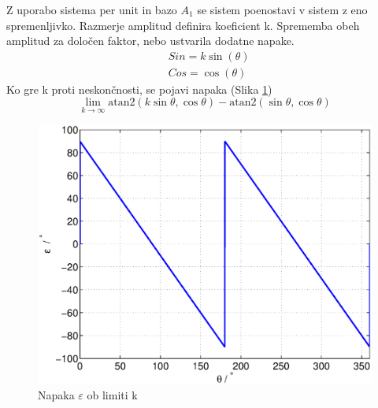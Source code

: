 \documentclass[a4paper]{article}
\begin{document}
Z uporabo sistema per unit in bazo $A_1$ se sistem poenostavi v sistem z eno spremenljivko. Razmerje amplitud definira koeficient k. Sprememba obeh amplitud za določen faktor, nebo ustvarila dodatne napake.
	\begin{eqnarray}
	\label{equ:def_sin_ama}
	&Sin = k \sin(\theta)\\
	\label{equ:def_cos_amp}
	&Cos =\cos(\theta)
	\end{eqnarray}
Ko gre k proti neskončnosti, se pojavi napaka (Slika \ref{fig:lim_amp})
\begin{equation}
\label{equ:amp_lim}
\lim_{k \rightarrow \infty} \mathrm{atan2}(k \sin{\theta},\cos{\theta})-\mathrm{atan2}(\sin{\theta},\cos{\theta})
\end{equation}
\begin{figure}[!htb]
	\begin{center}
		\includegraphics[width=\linewidth]{./Slike/lim_amp.eps}
		\caption{Napaka $\varepsilon$ ob limiti k} \label{fig:lim_amp}
	\end{center}
\end{figure}
\end{document}
